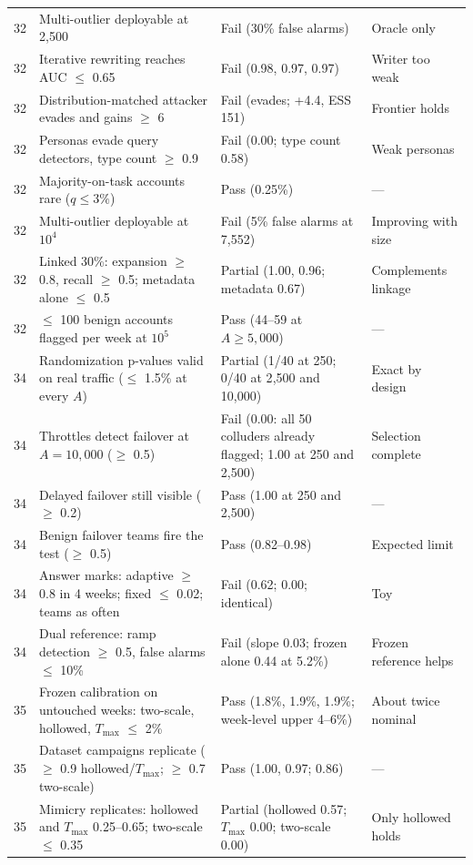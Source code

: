 \begin{longtable}{p{}p{}p{}p{}}
32 & Multi-outlier deployable at 2{,}500 & Fail (30\% false alarms) & Oracle only \\
32 & Iterative rewriting reaches AUC $\le$ 0.65 & Fail (0.98, 0.97, 0.97) & Writer too weak \\
32 & Distribution-matched attacker evades and gains $\ge$ 6 & Fail (evades; +4.4, ESS 151) & Frontier holds \\
32 & Personas evade query detectors, type count $\ge$ 0.9 & Fail (0.00; type count 0.58) & Weak personas \\
32 & Majority-on-task accounts rare ($q\le 3\%$) & Pass (0.25\%) & --- \\
32 & Multi-outlier deployable at $10^4$ & Fail (5\% false alarms at 7{,}552) & Improving with size \\
32 & Linked 30\%: expansion $\ge$ 0.8, recall $\ge$ 0.5; metadata alone $\le$ 0.5 & Partial (1.00, 0.96; metadata 0.67) & Complements linkage \\
32 & $\le$ 100 benign accounts flagged per week at $10^5$ & Pass (44--59 at $A\ge5{,}000$) & --- \\
34 & Randomization p-values valid on real traffic ($\le$ 1.5\% at every $A$) & Partial (1/40 at 250; 0/40 at 2{,}500 and 10{,}000) & Exact by design \\
34 & Throttles detect failover at $A=10{,}000$ ($\ge$ 0.5) & Fail (0.00: all 50 colluders already flagged; 1.00 at 250 and 2{,}500) & Selection complete \\
34 & Delayed failover still visible ($\ge$ 0.2) & Pass (1.00 at 250 and 2{,}500) & --- \\
34 & Benign failover teams fire the test ($\ge$ 0.5) & Pass (0.82--0.98) & Expected limit \\
34 & Answer marks: adaptive $\ge$ 0.8 in 4 weeks; fixed $\le$ 0.02; teams as often & Fail (0.62; 0.00; identical) & Toy \\
34 & Dual reference: ramp detection $\ge$ 0.5, false alarms $\le$ 10\% & Fail (slope 0.03; frozen alone 0.44 at 5.2\%) & Frozen reference helps \\
35 & Frozen calibration on untouched weeks: two-scale, hollowed, $T_{\max}$ $\le$ 2\% & Pass (1.8\%, 1.9\%, 1.9\%; week-level upper 4--6\%) & About twice nominal \\
35 & Dataset campaigns replicate ($\ge$ 0.9 hollowed/$T_{\max}$; $\ge$ 0.7 two-scale) & Pass (1.00, 0.97; 0.86) & --- \\
35 & Mimicry replicates: hollowed and $T_{\max}$ 0.25--0.65; two-scale $\le$ 0.35 & Partial (hollowed 0.57; $T_{\max}$ 0.00; two-scale 0.00) & Only hollowed holds \\

\end{longtable}
